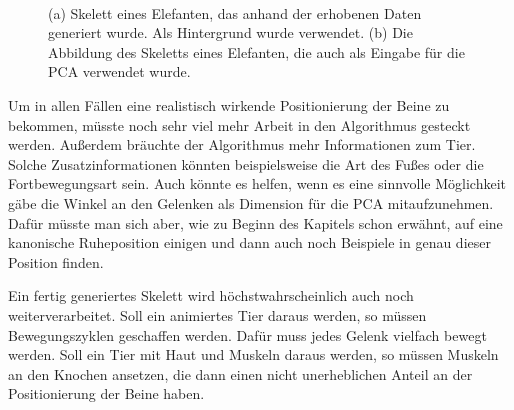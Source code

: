 \begin{figure}
 ~
 
 \caption{(a) Skelett eines Elefanten, das anhand der erhobenen Daten generiert wurde. Als Hintergrund wurde \cite{background} verwendet. (b) Die Abbildung des Skeletts eines Elefanten, die auch als Eingabe für die PCA verwendet wurde.}
 \label{elefant}
\end{figure}


Um in allen Fällen eine realistisch wirkende Positionierung der Beine zu bekommen, müsste noch sehr viel mehr Arbeit in den Algorithmus gesteckt werden. Außerdem bräuchte der Algorithmus mehr Informationen zum Tier. Solche Zusatzinformationen könnten beispielsweise die Art des Fußes oder die Fortbewegungsart sein. Auch könnte es helfen, wenn es eine sinnvolle Möglichkeit gäbe die Winkel an den Gelenken als Dimension für die PCA mitaufzunehmen. Dafür müsste man sich aber, wie zu Beginn des Kapitels schon erwähnt, auf eine kanonische Ruheposition einigen und dann auch noch Beispiele in genau dieser Position finden.

Ein fertig generiertes Skelett wird höchstwahrscheinlich auch noch weiterverarbeitet. Soll \zb ein animiertes Tier daraus werden, so müssen Bewegungszyklen geschaffen werden. Dafür muss jedes Gelenk vielfach bewegt werden. Soll ein Tier mit Haut und Muskeln daraus werden, so müssen Muskeln an den Knochen ansetzen, die dann einen nicht unerheblichen Anteil an der Positionierung der Beine haben.

